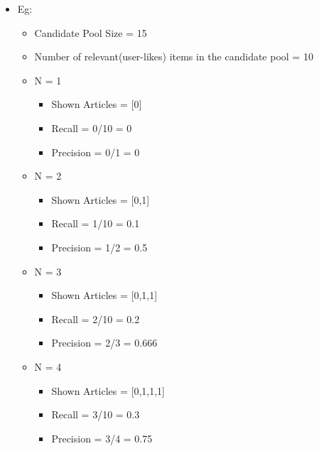 \documentclass[a4paper,fontsize=8.0pt]{scrartcl}
\begin{document}
\begin{flushleft}
\begin{itemize}
    \item Eg:  \begin{itemize}
        \item Candidate Pool Size = 15
        \item Number of relevant(user-likes) items in the candidate pool = 10
        \item N = 1 \begin{itemize}
            \item Shown Articles = [0]
            \item Recall = 0/10 = 0
            \item Precision = 0/1 = 0
        \end{itemize}
        \item N = 2 \begin{itemize}
            \item Shown Articles = [0,1]
            \item Recall = 1/10 = 0.1
            \item Precision = 1/2 = 0.5
        \end{itemize}
        \item N = 3 \begin{itemize}
            \item Shown Articles = [0,1,1]
            \item Recall = 2/10 = 0.2
            \item Precision = 2/3 = 0.666
        \end{itemize}
        \item N = 4 \begin{itemize}
            \item Shown Articles = [0,1,1,1]
            \item Recall = 3/10 = 0.3
            \item Precision = 3/4 = 0.75
        \end{itemize}
    \end{itemize}
    
\end{itemize}
\end{flushleft}
\end{document}
